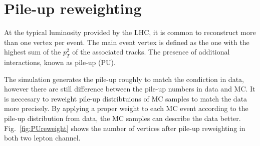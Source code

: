 
\section{Pile-up reweighting}
At the typical luminosity provided by the LHC, it is common to reconstruct more than one vertex per event. The main event vertex is defined as the one with the highest sum of the $p_{T}^{2}$ of the associated tracks. The presence of additional interactions, known as pile-up (PU). 

The simulation generates the pile-up roughly to match the condiction in data, however there are still difference between the pile-up numbers in data and MC. It is neccesary to reweight pile-up distribtuions of MC samples to match the data more precisely. By applying a proper weight to each MC event according to the pile-up distribution from data, the MC samples can describe the data better. Fig.~\ref{fig:PUreweight} shows the number of vertices after pile-up reweighting in both two lepton channel.

